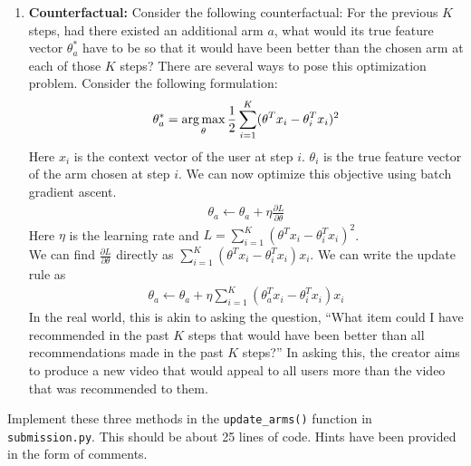 \begin{enumerate}[(1)]
\item \textbf{Counterfactual:} Consider the following counterfactual: For the previous $K$ steps, had there existed an additional arm $a$, what would its true feature vector $\theta_a^*$ have to be so that it would have been better than the chosen arm at each of those $K$ steps? There are several ways to pose this optimization problem. Consider the following formulation:
\begin{align}
    \theta_a^* = \operatorname*{arg\,max}_{\theta} \frac{1}{2}\sum_{i=1}^{K}(\theta^Tx_i - \theta_i^Tx_i)^2
\end{align}
Here $x_i$ is the context vector of the user at step $i$. $\theta_i$ is the true feature vector of the arm chosen at step $i$. We can now optimize this objective using batch gradient ascent.\\
\begin{align}
    \theta_a \leftarrow \theta_a + \eta \frac{\partial L}{\partial \theta}
\end{align}
Here $\eta$ is the learning rate and $L = \sum_{i=1}^{K}(\theta^Tx_i - \theta_i^Tx_i)^2$.\\
We can find $\frac{\partial L}{\partial \theta}$ directly as $\sum_{i=1}^{K} (\theta^Tx_i - \theta_i^Tx_i)x_i$. We can write the update rule as \\
\begin{align}
    \theta_a \leftarrow \theta_a + \eta \sum_{i=1}^{K} (\theta_a^Tx_i - \theta_i^Tx_i)x_i
\end{align}
In the real world, this is akin to asking the question, ``What item could I have recommended in the past $K$ steps that would have been better than all recommendations made in the past $K$ steps?'' In asking this, the creator aims to produce a new video that would appeal to all users more than the video that was recommended to them.
\end{enumerate}

\item {} Implement these three methods in the \texttt{update\_arms()} function in \texttt{submission.py}. This should be about 25 lines of code. Hints have been provided in the form of comments.
